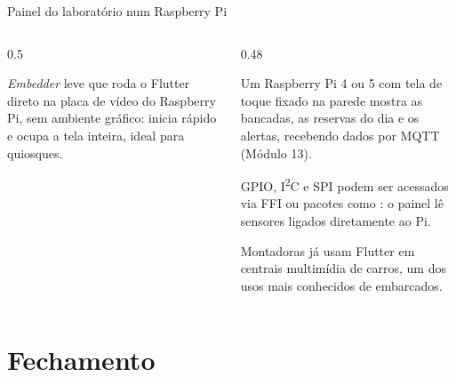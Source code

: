 \documentclass[aspectratio=169,10pt]{beamer}
\begin{document}
\begin{frame}[fragile]{Painel do laboratório num Raspberry Pi}
  \begin{columns}[T]
    \begin{column}{0.5\textwidth}
      \begin{conceito}
        \emph{Embedder} leve que roda o Flutter direto na placa de vídeo do Raspberry Pi, sem ambiente gráfico: inicia rápido e ocupa a tela inteira, ideal para quiosques.
      \end{conceito}
    \end{column}
    \begin{column}{0.48\textwidth}
      \begin{exemplo}
        Um Raspberry Pi 4 ou 5 com tela de toque fixado na parede mostra as bancadas, as reservas do dia e os alertas, recebendo dados por MQTT (Módulo 13).
      \end{exemplo}
      \begin{dica}
        GPIO, I\textsuperscript{2}C e SPI podem ser acessados via FFI ou pacotes como : o painel lê sensores ligados diretamente ao Pi.
      \end{dica}
      \begin{historia}
        Montadoras já usam Flutter em centrais multimídia de carros, um dos usos mais conhecidos de embarcados.
      \end{historia}
    \end{column}
  \end{columns}
\end{frame}

\section{Fechamento}
\end{document}
